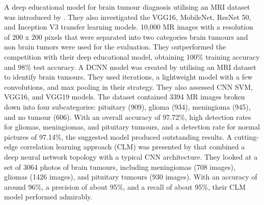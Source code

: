 \documentclass[12pt, a4paper,twoside]{report}
\theoremstyle{plain} %
\theoremstyle{definition} %
\theoremstyle{remark} %
\numberwithin{equation}{chapter}
\begin{document}
A deep educational model for brain tumour diagnosis utilising an MRI dataset was introduced by \cite{almadhoun22}. They also investigated the VGG16, MobileNet, ResNet 50, and Inception V3 transfer learning models. 10,000 MR images with a resolution of 200 x 200 pixels that were separated into two categories brain tumours and non brain tumors were used for the evaluation. They outperformed the competition with their deep educational model, obtaining 100\% training accuracy and 98\% test accuracy. A DCNN model was created by \cite{musallam22} utilising an MRI dataset to identify brain tumours. They used iterations, a lightweight model with a few convolutions, and max pooling in their strategy. They also assessed CNN SVM, VGG16, and VGG19 models. The dataset contained 3394 MR images broken down into four subcategories: pituitary (909), glioma (934), meningioma (945), and no tumour (606). With an overall accuracy of 97.72\%, high detection rates for gliomas, meningiomas, and pituitary tumours, and a detection rate for normal pictures of 97.14\%, the suggested model produced outstanding results. A cutting-edge correlation learning approach (CLM) was presented by \cite{wozniak21} that combined a deep neural network topology with a typical CNN architecture. They looked at a set of 3064 photos of brain tumours, including meningiomas (708 images), gliomas (1426 images), and pituitary tumours (930 images). With an accuracy of around 96\%, a precision of about 95\%, and a recall of about 95\%, their CLM model performed admirably.
\end{document}
